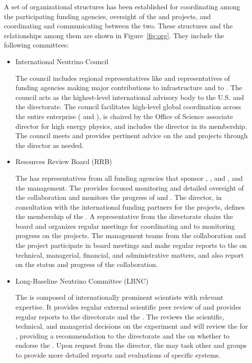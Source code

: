 A set  of  organizational structures  has been established  for
coordinating  among  the  participating  funding agencies,
oversight of the  and  projects,
and coordinating and communicating between the 
two. These structures and the relationships among them are shown 
in Figure~\ref{fig:org}. They include %
the following committees:
\begin{itemize}
\item International Neutrino Council 

The council  includes %
regional representatives like  and representatives of funding agencies making major contributions to  infrastructure and to . The council acts as the highest-level international advisory body to the U.S.  and the  directorate. The council facilitates high-level global coordination across the entire enterprise ( and ), is chaired by the  Office of Science associate director for high energy physics, and includes the  director in its membership. The council meets and provides pertinent advice on the  and  projects through the  director as needed.
\item Resources Review Board (RRB)

The  has representatives from all funding agencies that sponsor , , and , and the  management. The  provides focused monitoring and detailed oversight of the  collaboration and monitors the progress of  and . The  director,  in consultation with the international funding partners for the projects, defines the membership of the . A representative from the  directorate chairs the board and organizes regular meetings for coordinating and to monitoring progress on the projects. The management teams from the  collaboration and the  project participate in board meetings and make regular reports to the  on technical, managerial, financial, and administrative matters, %
and also report on the status and progress of the  collaboration.

\item Long-Baseline Neutrino Committee (LBNC)

The  is composed of internationally prominent scientists with relevant expertise. It provides regular external scientific peer review of  and provides regular reports to the   directorate and the . The  reviews the scientific, technical, and managerial decisions on the  experiment and will review the  for , providing a recommendation to the  directorate and the  on whether to endorse the . Upon request from the  director, the  may task other  and  groups to provide more detailed reports and evaluations of specific systems.


\end{itemize}
